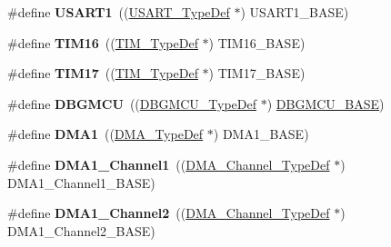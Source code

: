 \begin{DoxyCompactItemize}
\#define {\bfseries U\+S\+A\+R\+T1}~((\hyperlink{struct_u_s_a_r_t___type_def}{U\+S\+A\+R\+T\+\_\+\+Type\+Def} $\ast$) U\+S\+A\+R\+T1\+\_\+\+B\+A\+SE)
\item 
\mbox{\label{group___peripheral__declaration_ga73ec606e7dacf17e18c661e8ff8c7c8d}} 
\#define {\bfseries T\+I\+M16}~((\hyperlink{struct_t_i_m___type_def}{T\+I\+M\+\_\+\+Type\+Def} $\ast$) T\+I\+M16\+\_\+\+B\+A\+SE)
\item 
\mbox{\label{group___peripheral__declaration_ga65aea6c8b36439e44ad6cde0e6891aab}} 
\#define {\bfseries T\+I\+M17}~((\hyperlink{struct_t_i_m___type_def}{T\+I\+M\+\_\+\+Type\+Def} $\ast$) T\+I\+M17\+\_\+\+B\+A\+SE)
\item 
\mbox{\label{group___peripheral__declaration_ga92ec6d9ec2251fda7d4ce09748cd74b4}} 
\#define {\bfseries D\+B\+G\+M\+CU}~((\hyperlink{struct_d_b_g_m_c_u___type_def}{D\+B\+G\+M\+C\+U\+\_\+\+Type\+Def} $\ast$) \hyperlink{group___peripheral__memory__map_ga4adaf4fd82ccc3a538f1f27a70cdbbef}{D\+B\+G\+M\+C\+U\+\_\+\+B\+A\+SE})
\item 
\mbox{\label{group___peripheral__declaration_gacc16d2a5937f7585320a98f7f6b578f9}} 
\#define {\bfseries D\+M\+A1}~((\hyperlink{struct_d_m_a___type_def}{D\+M\+A\+\_\+\+Type\+Def} $\ast$) D\+M\+A1\+\_\+\+B\+A\+SE)
\item 
\mbox{\label{group___peripheral__declaration_gac83c5be824be1c02716e2522e80ddf7a}} 
\#define {\bfseries D\+M\+A1\+\_\+\+Channel1}~((\hyperlink{struct_d_m_a___channel___type_def}{D\+M\+A\+\_\+\+Channel\+\_\+\+Type\+Def} $\ast$) D\+M\+A1\+\_\+\+Channel1\+\_\+\+B\+A\+SE)
\item 
\mbox{\label{group___peripheral__declaration_ga23d7631dd10c645e06971b2543ba2949}} 
\#define {\bfseries D\+M\+A1\+\_\+\+Channel2}~((\hyperlink{struct_d_m_a___channel___type_def}{D\+M\+A\+\_\+\+Channel\+\_\+\+Type\+Def} $\ast$) D\+M\+A1\+\_\+\+Channel2\+\_\+\+B\+A\+SE)
\item 
\mbox{\label{group___peripheral__declaration_gacf7b6093a37b306d7f1f50b2f200f0d0}} 

\end{DoxyCompactItemize}
